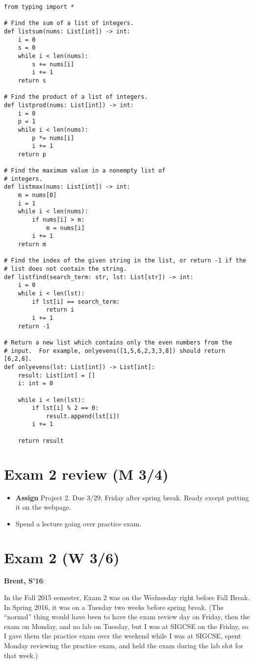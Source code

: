 \documentclass{article}
\newenvironment{reflect}[1]
{
  \noindent
  \begin{lrbox}{\reflectbox}
    \begin{minipage}[t]{\textwidth}
      \textbf{#1}:
}{
    \end{minipage}
  \end{lrbox}
  \fbox{\usebox{\reflectbox}}
}
\newcommand{\notready}{\textcolor{red}{\XSolidBold}\xspace}
\newcommand{\ready}{\textcolor{Green}{\Checkmark}\xspace}
\begin{document}
\begin{verbatim}
from typing import *

# Find the sum of a list of integers.
def listsum(nums: List[int]) -> int:
    i = 0
    s = 0
    while i < len(nums):
        s += nums[i]
        i += 1
    return s

# Find the product of a list of integers.
def listprod(nums: List[int]) -> int:
    i = 0
    p = 1
    while i < len(nums):
        p *= nums[i]
        i += 1
    return p

# Find the maximum value in a nonempty list of
# integers.
def listmax(nums: List[int]) -> int:
    m = nums[0]
    i = 1
    while i < len(nums):
        if nums[i] > m:
            m = nums[i]
        i += 1
    return m

# Find the index of the given string in the list, or return -1 if the
# list does not contain the string.
def listfind(search_term: str, lst: List[str]) -> int:
    i = 0
    while i < len(lst):
        if lst[i] == search_term:
            return i
        i += 1
    return -1

# Return a new list which contains only the even numbers from the
# input.  For example, onlyevens([1,5,6,2,3,3,8]) should return [6,2,8].
def onlyevens(lst: List[int]) -> List[int]:
    result: List[int] = []
    i: int = 0

    while i < len(lst):
        if lst[i] % 2 == 0:
            result.append(lst[i])
        i += 1

    return result
\end{verbatim}

\newpage
\section{\ready Exam 2 review (M 3/4)}

\begin{itemize}
\item \notready \textbf{Assign} Project 2.  Due 3/29, Friday after
  spring break.  Ready except putting it on the webpage.
\item Spend a lecture going over practice exam.
\end{itemize}

\section{\ready Exam 2 (W 3/6)}

\begin{reflect}{Brent, S'16}
  In the Fall 2015 semester, Exam 2 was on the Wednesday right before
  Fall Break.  In Spring 2016, it was on a Tuesday two weeks before
  spring break. (The ``normal'' thing would have been to have the exam
  review day on Friday, then the exam on Monday, and no lab on
  Tuesday, but I was at SIGCSE on the Friday, so I gave them the
  practice exam over the weekend while I was at SIGCSE, spent Monday
  reviewing the practice exam, and held the exam during the lab slot
  for that week.)
\end{reflect}
\end{document}
